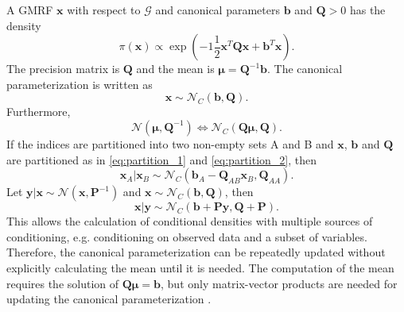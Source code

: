 A GMRF $\pmb{x}$ with respect to $\mathcal{G}$ and canonical parameters $\pmb{b}$ and $\pmb{Q}>0$ has the density
\begin{equation*}
    \pi\left(\pmb{x}\right)\propto\exp\left(-1\frac{1}{2}\pmb{x}^T\pmb{Q}\pmb{x}+\pmb{b}^T\pmb{x}\right).
\end{equation*}
The precision matrix is $\pmb{Q}$ and the mean is $\pmb{\mu}=\pmb{Q}^{-1}\pmb{b}$. The canonical parameterization is written as 
\begin{equation*}
    \pmb{x}\sim \mathcal{N}_C\left(\pmb{b},\pmb{Q}\right).
\end{equation*}
Furthermore,
\begin{equation*}
    \mathcal{N}\left(\pmb{\mu},\pmb{Q}^{-1}\right) \Longleftrightarrow \mathcal{N}_C\left(\pmb{Q\mu}, \pmb{Q}\right).
\end{equation*}
If the indices are partitioned into two non-empty sets A and B and $\pmb{x}$, $\pmb{b}$ and $\pmb{Q}$ are partitioned as in \eqref{eq:partition_1} and \eqref{eq:partition_2}, then
\begin{equation}
    \pmb{x}_A|\pmb{x}_B\sim\mathcal{N}_C\left(\pmb{b}_A-\pmb{Q}_{AB}\pmb{x}_B,\pmb{Q}_{AA}\right).
\end{equation}
Let $\pmb{y}|\pmb{x}\sim\mathcal{N}\left(\pmb{x},\pmb{P}^{-1}\right)$ and $\pmb{x}\sim\mathcal{N}_C\left(\pmb{b},\pmb{Q}\right)$, then
\begin{equation}
    \pmb{x}|\pmb{y}\sim\mathcal{N}_C\left(\pmb{b}+\pmb{Py}, \pmb{Q}+\pmb{P}\right).
\end{equation}
This allows the calculation of conditional densities with multiple sources of conditioning, e.g. conditioning on observed data and a subset of variables. Therefore, the canonical parameterization can be repeatedly updated without explicitly calculating the mean until it is needed. The computation of the mean requires the solution of $\pmb{Q\mu}=\pmb{b}$, but only matrix-vector products are needed for updating the canonical parameterization \autocite[][25--27]{rue2005gaussian}.
